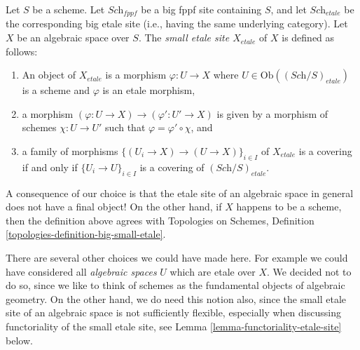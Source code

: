 \begin{definition}
\label{definition-etale-site}
Let $S$ be a scheme.
Let $\textit{Sch}_{fppf}$ be a big fppf site containing $S$,
and let $\textit{Sch}_{etale}$ be the corresponding big etale site
(i.e., having the same underlying category).
Let $X$ be an algebraic space over $S$.
The {\it small etale site $X_{etale}$} of $X$ is defined as follows:
\begin{enumerate}
\item An object of $X_{etale}$ is a morphism $\varphi : U \to X$
where $U \in \text{Ob}((\textit{Sch}/S)_{etale})$ is a scheme and
$\varphi$ is an etale morphism,
\item a morphism $(\varphi : U \to X) \to (\varphi' : U' \to X)$
is given by a morphism of schemes $\chi : U \to U'$ such that
$\varphi = \varphi' \circ \chi$, and
\item a family of morphisms $\{(U_i \to X) \to (U \to X)\}_{i \in I}$
of $X_{etale}$ is a covering if and only if $\{U_i \to U\}_{i \in I}$
is a covering of $(\textit{Sch}/S)_{etale}$.
\end{enumerate}
\end{definition}

\noindent
A consequence of our choice is that the etale site of an algebraic space
in general does not have a final object! On the other hand, if $X$ happens
to be a scheme, then the definition above agrees with
Topologies on Schemes,
Definition \ref{topologies-definition-big-small-etale}.

\medskip\noindent
There are several other choices we could have made here. For example
we could have considered all {\it algebraic spaces} $U$ which are etale
over $X$. We decided not to do so, since we like to think of schemes as
the fundamental objects of algebraic geometry. On the other hand, we
do need this notion also, since the small etale site of an algebraic
space is not sufficiently flexible, especially when discussing functoriality
of the small etale site, see Lemma \ref{lemma-functoriality-etale-site}
below.

